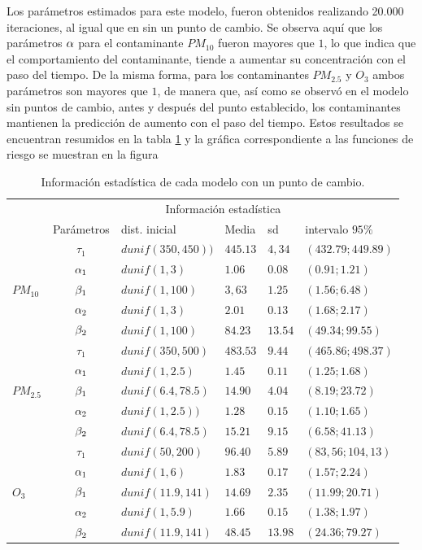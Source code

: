 Los parámetros estimados para este modelo, fueron obtenidos realizando 20.000 iteraciones, al igual que en sin un punto de cambio. Se observa aquí que los parámetros $\alpha$ para el contaminante $PM_{10}$ fueron mayores que $1$, lo que indica que el comportamiento del contaminante, tiende a  aumentar su concentración con el paso del tiempo. De la misma forma, para los contaminantes  $PM_{2.5}$ y $O_3$ ambos parámetros son mayores que $1$, de manera que, así como se observó en el modelo sin puntos de cambio, antes y después del punto establecido, los contaminantes mantienen la predicción de aumento con el paso del tiempo. Estos resultados se encuentran resumidos en la tabla \ref{infoestadupc} y la gráfica correspondiente a las funciones de riesgo se muestran en la figura 
 


\begin{table}[!h]
\centering
\begin{tabular}{|l|c|l|l|l|l|}
\hline
& \multicolumn{5}{c|}{Información estadística} \\
\cline{2-6}
& Parámetros & dist. inicial  & Media & sd  &   intervalo $95 \%$\\
\hline \hline
\multirow{5}{1.5cm}{$PM_{10}$} & $\tau_1$ & $dunif(350,450))$ & $445.13$ & $ 4,34 $ & $(432.79;449.89)$ \\ \cline{2-6}
& $\alpha_1$& $dunif(1, 3)$ & $1.06$ & $0.08$ & $(0.91;1.21)$\\  \cline{2-6}
& $\beta_1$& $dunif(1,100)$ & $3,63$ & $1.25$ & $(1.56;6.48)$\\  \cline{2-6}
& $\alpha_2$& $dunif(1,3)$ & $2.01$ & $0.13$ & $(1.68; 2.17)$\\  \cline{2-6}
& $\beta_2$& $dunif(1,100)$ & $84.23$ & $13.54 $ & $(49.34;99.55)$\\  \cline{1-6}
\multirow{5}{1.5cm}{$PM_{2.5}$} & $\tau_1$ & $dunif(350,500)$& $483.53$ & $9.44$ & $(465.86;498.37)$\\ \cline{2-6}
& $\alpha_1$& $dunif(1,2.5)$ & $1.45$ & $0.11$ & $(1.25;1.68)$\\  \cline{2-6}
& $\beta_1$& $dunif(6.4, 78.5)$ & $14.90$ & $4.04$ & $(8.19;23.72)$\\  \cline{2-6}
& $\alpha_2$& $dunif(1,2.5))$ & $1.28$ & $0.15$ & $(1.10;1.65)$\\  \cline{2-6}
& $\beta_2$& $dunif(6.4, 78.5)$ & $15.21$ & $9.15$ & $(6.58;41.13)$\\  \cline{1-6}
\multirow{5}{1.5cm}{$O_3$} & $\tau_1$ & $dunif(50,200)$ & $96.40$& $5.89$ & $(83,56;104,13)$\\ \cline{2-6}
& $\alpha_1$& $dunif(1, 6)$ & $1.83$ & $0.17$ & $(1.57;2.24)$\\  \cline{2-6}
& $\beta_1$& $dunif(11.9, 141)$ & $14.69$ & $2.35$ & $(11.99; 20.71)$\\  \cline{2-6}
& $\alpha_2$& $dunif(1, 5.9)$ & $1.66$ & $0.15$ & $(1.38;1.97)$\\  \cline{2-6}
& $\beta_2$& $dunif(11.9, 141)$ & $48.45$ & $13.98$ & $(24.36;79.27)$\\  \cline{1-6}
\end{tabular}

\caption{Información estadística de cada modelo con un  punto de cambio.}
\label{infoestadupc}
\end{table}


